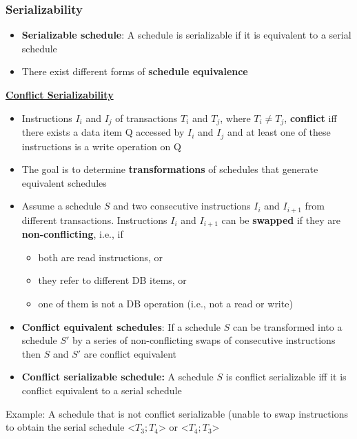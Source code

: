 \subsubsection{Serializability}
\begin{itemize}[label=\(\rhd\)]
    \item \textbf{Serializable schedule}: A schedule is serializable if it is equivalent to a serial schedule
    \item There exist different forms of \textbf{schedule equivalence}
\end{itemize}
\bigskip
\textbf{\underline{Conflict Serializability}}\\

\begin{itemize}[label=\(\rhd\)]
    \item Instructions $I_i$ and $I_j$ of transactions $T_i$ and $T_j$, where $T_i \neq T_j$, \textbf{conflict} iff there exists a data item Q accessed by $I_i$ and $I_j$ and at least one of these instructions is a write operation on Q
    \item The goal is to determine \textbf{transformations} of schedules that generate equivalent schedules
    \item Assume a schedule $S$ and two consecutive instructions $I_i$ and $I_{i+1}$ from different transactions. Instructions $I_i$ and $I_{i+1}$ can be \textbf{swapped} if they are \textbf{non-conflicting}, i.e., if
    \begin{itemize}[label=\(\rhd\)]
        \item both are read instructions, or
        \item they refer to different DB items, or
        \item one of them is not a DB operation (i.e., not a read or write)
    \end{itemize}
    \item \textbf{Conflict equivalent schedules}: If a schedule $S$ can be transformed into a schedule $S'$ by a series of non-conflicting swaps of consecutive instructions then $S$ and $S'$ are conflict equivalent
    \item \textbf{Conflict serializable schedule:} A schedule $S$ is conflict serializable iff it is conflict equivalent to a serial schedule 
\end{itemize}

Example: A schedule that is not conflict serializable (unable to swap instructions to obtain the serial schedule <$T_3;T_4$> or <$T_4;T_3$>

